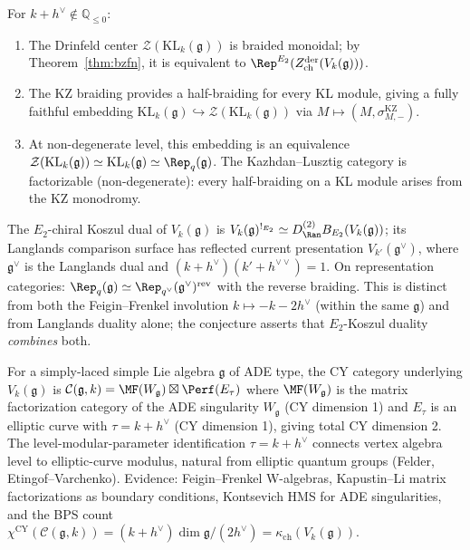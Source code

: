 \begin{proposition}
\label{prop:thy-kl-drinfeld-center-kl}
For $k+h^\vee\notin\mathbb{Q}_{\leq 0}$:
\begin{enumerate}[label=\textup{(\roman*)}]
\item The Drinfeld center $\mathcal{Z}(\mathrm{KL}_k(\mathfrak{g}))$ is braided
monoidal; by Theorem~\ref{thm:bzfn}, it is equivalent to
$\Rep^{E_2}(Z^{\mathrm{der}}_{\mathrm{ch}}(V_k(\mathfrak{g})))$.
\item The KZ braiding provides a half-braiding for every KL module, giving a
fully faithful embedding $\mathrm{KL}_k(\mathfrak{g})\hookrightarrow
\mathcal{Z}(\mathrm{KL}_k(\mathfrak{g}))$ via $M\mapsto(M,\sigma^{\mathrm{KZ}}_{M,-})$.
\item At non-degenerate level, this embedding is an equivalence
$\mathcal{Z}(\mathrm{KL}_k(\mathfrak{g}))\simeq\mathrm{KL}_k(\mathfrak{g})
\simeq\Rep_q(\mathfrak{g})$. The Kazhdan--Lusztig category is factorizable
(non-degenerate): every half-braiding on a KL module arises from the KZ monodromy.
\end{enumerate}
\end{proposition}

\begin{conjecture}
\label{conj:thy-kl-e2-koszul-langlands}
\ClaimStatusConjectured
The $E_2$-chiral Koszul dual of $V_k(\mathfrak{g})$ is
$V_k(\mathfrak{g})^{!_{E_2}}\simeq
D_{\Ran}^{(2)}B_{E_2}(V_k(\mathfrak g))$; its Langlands comparison
surface has reflected current presentation $V_{k'}(\mathfrak{g}^\vee)$,
where $\mathfrak{g}^\vee$ is the Langlands dual and $(k+h^\vee)(k'+h^{\vee\vee})=1$.
On representation categories: $\Rep_q(\mathfrak{g})\simeq
\Rep_{q^\vee}(\mathfrak{g}^\vee)^{\mathrm{rev}}$ with the reverse braiding.
This is distinct from both the Feigin--Frenkel involution $k\mapsto-k-2h^\vee$
(within the same $\mathfrak{g}$) and from Langlands duality alone; the
conjecture asserts that $E_2$-Koszul duality \emph{combines} both.
\end{conjecture}

\begin{conjecture}
\label{conj:thy-kl-cy-category-km}
\ClaimStatusConjectured
For a simply-laced simple Lie algebra $\mathfrak{g}$ of ADE type, the CY
category underlying $V_k(\mathfrak{g})$ is
$\mathcal{C}(\mathfrak{g},k)=\MF(W_\mathfrak{g})\boxtimes\Perf(E_\tau)$
where $\MF(W_\mathfrak{g})$ is the matrix factorization category of the ADE
singularity $W_\mathfrak{g}$ (CY dimension 1) and $E_\tau$ is an elliptic
curve with $\tau=k+h^\vee$ (CY dimension 1), giving total CY dimension 2.
The level-modular-parameter identification $\tau=k+h^\vee$ connects vertex
algebra level to elliptic-curve modulus, natural from elliptic quantum groups
(Felder, Etingof--Varchenko). Evidence: Feigin--Frenkel W-algebras, Kapustin--Li
matrix factorizations as boundary conditions, Kontsevich HMS for ADE singularities,
and the BPS count $\chi^{\mathrm{CY}}(\mathcal{C}(\mathfrak{g},k))=(k+h^\vee)\dim\mathfrak{g}/(2h^\vee)=\kappa_{\mathrm{ch}}(V_k(\mathfrak{g}))$.
\end{conjecture}

